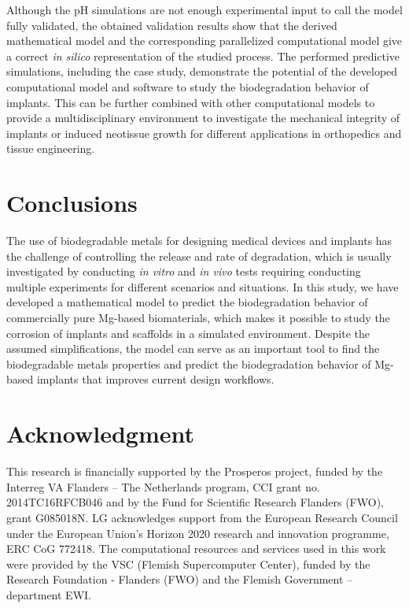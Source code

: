 Although the pH simulations are not enough experimental input to call the model fully validated, the obtained validation results show that the derived mathematical model and the corresponding parallelized computational model give a correct \textit{in silico} representation of the studied process. The performed predictive simulations, including the case study, demonstrate the potential of the developed computational model and software to study the biodegradation behavior of implants. This can be further combined with other computational models to provide a multidisciplinary environment to investigate the mechanical integrity of implants or induced neotissue growth for different applications in orthopedics and tissue engineering.

\section{Conclusions}

The use of biodegradable metals for designing medical devices and implants has the challenge of controlling the release and rate of degradation, which is usually investigated by conducting \textit{in vitro} and \textit{in vivo} tests requiring conducting multiple experiments for different scenarios and situations. In this study, we have developed a mathematical model to predict the biodegradation behavior of commercially pure Mg-based biomaterials, which makes it possible to study the corrosion of implants and scaffolds in a simulated environment. Despite the assumed simplifications, the model can serve as an important tool to find the biodegradable metals properties and predict the biodegradation behavior of Mg-based implants that improves current design workflows.


\section*{Acknowledgment}

This research is financially supported by the Prosperos project, funded by the Interreg VA Flanders – The Netherlands program, CCI grant no. 2014TC16RFCB046 and by the Fund for Scientific Research Flanders (FWO), grant G085018N. LG acknowledges support from the European Research Council under the European Union's Horizon 2020 research and innovation programme, ERC CoG 772418. The computational resources and services used in this work were provided by the VSC (Flemish Supercomputer Center), funded by the Research Foundation - Flanders (FWO) and the Flemish Government – department EWI.


\cleardoublepage
